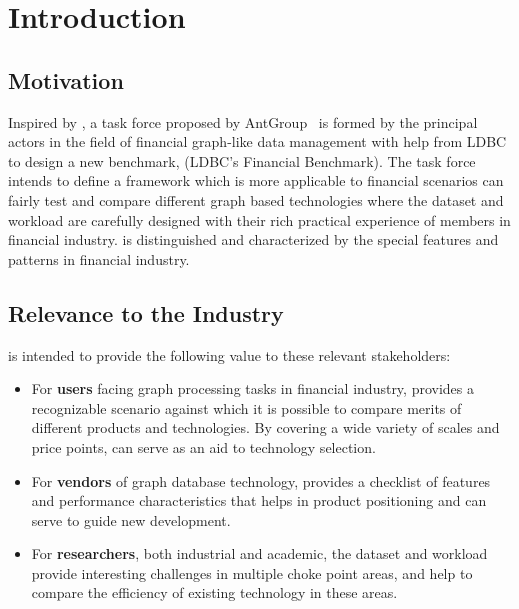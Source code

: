 \chapter{Introduction}
\label{sec:introduction}


\section{Motivation}

Inspired by \ldbcsnb, a task force proposed by AntGroup~\cite{antgroup} is
formed by the principal actors in the field of financial graph-like data
management with help from LDBC to design a new benchmark, \ldbcfinbench (LDBC's
Financial Benchmark). The task force intends to define a framework which is more
applicable to financial scenarios can fairly test and compare different graph
based technologies where the dataset and workload are carefully designed with
their rich practical experience of members in financial industry. \ldbcfinbench
is distinguished and characterized by the special features and patterns in
financial industry.


\section{Relevance to the Industry}

\ldbcfinbench is intended to provide the following value to these relevant
stakeholders:

\begin{itemize}
    \item For \textbf{users} facing graph processing tasks in financial industry,
          \ldbcfinbench provides a recognizable scenario against which it is possible
          to compare merits of different products and technologies. By covering a wide
          variety of scales and price points, \ldbcfinbench can serve as an aid to
          technology selection.
    \item For \textbf{vendors} of graph database technology, \ldbcfinbench provides a
          checklist of features and performance characteristics that helps in product
          positioning and can serve to guide new development.
    \item For \textbf{researchers}, both industrial and academic, the \ldbcfinbench
          dataset and workload provide interesting challenges in multiple choke point
          areas, and help to compare the efficiency of existing technology in these
          areas.
\end{itemize}

